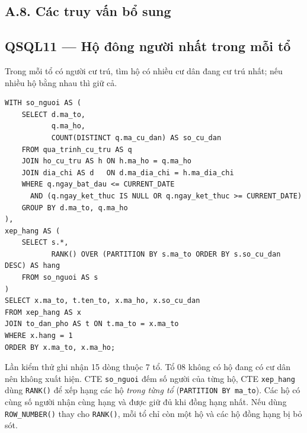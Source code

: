 \subsection*{A.8. Các truy vấn bổ sung}
\label{sec:qsql-bo-sung}

\noindent\begin{minipage}{\linewidth}
\subsection*{QSQL11 --- Hộ đông người nhất trong mỗi tổ}

Trong mỗi tổ có người cư trú, tìm hộ có nhiều cư dân đang cư trú nhất; nếu nhiều hộ bằng nhau thì giữ cả.

\begin{lstlisting}[style=sqlvn, basicstyle=\ttfamily\fontsize{10pt}{10.5pt}\selectfont]
WITH so_nguoi AS (
    SELECT d.ma_to,
           q.ma_ho,
           COUNT(DISTINCT q.ma_cu_dan) AS so_cu_dan
    FROM qua_trinh_cu_tru AS q
    JOIN ho_cu_tru AS h ON h.ma_ho = q.ma_ho
    JOIN dia_chi AS d   ON d.ma_dia_chi = h.ma_dia_chi
    WHERE q.ngay_bat_dau <= CURRENT_DATE
      AND (q.ngay_ket_thuc IS NULL OR q.ngay_ket_thuc >= CURRENT_DATE)
    GROUP BY d.ma_to, q.ma_ho
),
xep_hang AS (
    SELECT s.*,
           RANK() OVER (PARTITION BY s.ma_to ORDER BY s.so_cu_dan DESC) AS hang
    FROM so_nguoi AS s
)
SELECT x.ma_to, t.ten_to, x.ma_ho, x.so_cu_dan
FROM xep_hang AS x
JOIN to_dan_pho AS t ON t.ma_to = x.ma_to
WHERE x.hang = 1
ORDER BY x.ma_to, x.ma_ho;
\end{lstlisting}

Lần kiểm thử ghi nhận 15 dòng thuộc 7 tổ. Tổ 08 không có hộ đang có cư dân nên không xuất hiện. CTE \texttt{so\_nguoi} đếm số người của từng hộ, CTE \texttt{xep\_hang} dùng \texttt{RANK()} để xếp hạng các hộ \emph{trong từng tổ} (\texttt{PARTITION BY ma\_to}). Các hộ có cùng số người nhận cùng hạng và được giữ đủ khi đồng hạng nhất. Nếu dùng \texttt{ROW\_NUMBER()} thay cho \texttt{RANK()}, mỗi tổ chỉ còn một hộ và các hộ đồng hạng bị bỏ sót.
\end{minipage}\par\medskip

